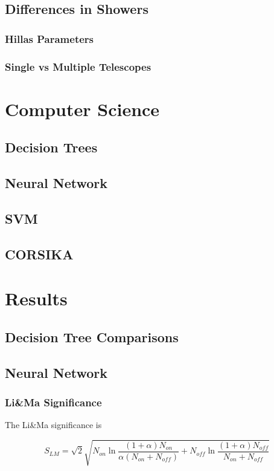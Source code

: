 \documentclass[12pt]{article}
\begin{document}
\subsection{Differences in Showers}
\subsubsection{Hillas Parameters}
\subsubsection{Single vs Multiple Telescopes}


\section{Computer Science}
\subsection{Decision Trees}
\subsection{Neural Network}
\subsection{SVM}
\subsection{CORSIKA}

\newpage
\section{Results}
\subsection{Decision Tree Comparisons}
\subsection{Neural Network}
\subsubsection{Li\&Ma Significance}
The Li\&Ma significance is \cite{2005A&A...430..355G} 

$$S_{LM} = \sqrt{2}\sqrt{N_{on}\ln{\frac{(1+\alpha)N_{on}}{\alpha(N_{on}+N_{off})}} + N_{off}\ln{\frac{(1+\alpha)N_{off}}{N_{on}+N_{off}}}} $$
\end{document}

